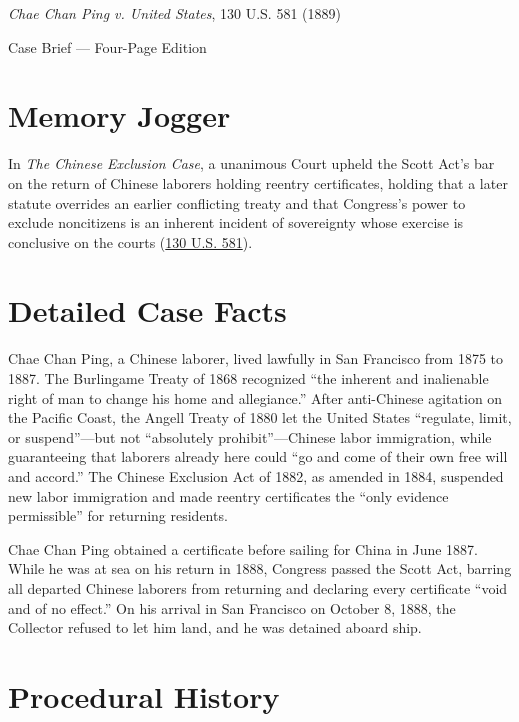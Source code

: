 \documentclass[12pt]{article}
\begin{document}
\begin{center}
{\LARGE \textit{Chae Chan Ping v. United States}, 130 U.S. 581 (1889)\par}
\vspace{0.8em}
{\large Case Brief --- Four-Page Edition\par}
\end{center}
\vspace{1em}

\section{Memory Jogger}

In \textit{The Chinese Exclusion Case}, a unanimous Court upheld the Scott Act's bar on the return of Chinese laborers holding reentry certificates, holding that a later statute overrides an earlier conflicting treaty and that Congress's power to exclude noncitizens is an inherent incident of sovereignty whose exercise is conclusive on the courts (\href{https://supreme.justia.com/cases/federal/us/130/581/}{130 U.S. 581}).

\section{Detailed Case Facts}

Chae Chan Ping, a Chinese laborer, lived lawfully in San Francisco from 1875 to 1887. The Burlingame Treaty of 1868 recognized ``the inherent and inalienable right of man to change his home and allegiance.'' After anti-Chinese agitation on the Pacific Coast, the Angell Treaty of 1880 let the United States ``regulate, limit, or suspend''---but not ``absolutely prohibit''---Chinese labor immigration, while guaranteeing that laborers already here could ``go and come of their own free will and accord.'' The Chinese Exclusion Act of 1882, as amended in 1884, suspended new labor immigration and made reentry certificates the ``only evidence permissible'' for returning residents.

Chae Chan Ping obtained a certificate before sailing for China in June 1887. While he was at sea on his return in 1888, Congress passed the Scott Act, barring all departed Chinese laborers from returning and declaring every certificate ``void and of no effect.'' On his arrival in San Francisco on October 8, 1888, the Collector refused to let him land, and he was detained aboard ship.

\section{Procedural History}
\end{document}
